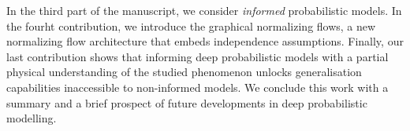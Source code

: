 In the third part of the manuscript, we consider \textit{informed} probabilistic models. In the fourht contribution, we introduce the graphical normalizing flows, a new normalizing flow architecture that embeds independence assumptions. Finally, our last contribution shows that informing deep probabilistic models with a partial physical understanding of the studied phenomenon unlocks generalisation capabilities inaccessible to non-informed models. We conclude this work with a summary and a brief prospect of future developments in deep probabilistic modelling.
